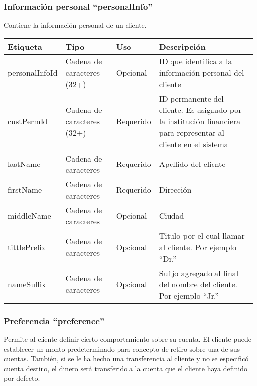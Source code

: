 \subsubsection{Información personal ``personalInfo''}
Contiene la información personal de un cliente.

\begin{center}
\begin{longtable}{|>{\centering\arraybackslash}p{}|>{\centering\arraybackslash}p{}|>{\centering\arraybackslash}p{}|>{\centering\arraybackslash}p{}|}
\hline 
\bfseries {Etiqueta} & \bfseries {Tipo} & \bfseries {Uso} & \bfseries {Descripción} \\ 
\hline 
personalInfoId & Cadena de caracteres (32+) & Opcional & ID que identifica a la información personal del cliente \\ 
\hline 
custPermId & Cadena de caracteres (32+) & Requerido & ID permanente del cliente. Es asignado por la institución financiera para representar al cliente en el sistema \\
\hline 
lastName & Cadena de caracteres & Requerido & Apellido del cliente \\ 
\hline 
firstName & Cadena de caracteres & Requerido & Dirección \\ 
\hline
middleName & Cadena de caracteres & Opcional & Ciudad \\ 
\hline
tittlePrefix & Cadena de caracteres & Opcional & Titulo por el cual llamar al cliente. Por ejemplo ``Dr.'' \\ 
\hline
nameSuffix & Cadena de caracteres & Opcional & Sufijo agregado al final del nombre del cliente. Por ejemplo ``Jr.'' \\ 
\hline
\end{longtable}
\end{center}

\subsubsection{Preferencia ``preference''}
Permite al cliente definir cierto comportamiento sobre su cuenta. El cliente puede establecer un monto predeterminado para concepto de retiro sobre una de sus cuentas. También, si se le ha hecho una transferencia al cliente y no se especificó cuenta destino, el dinero será transferido a la cuenta que el cliente haya definido por defecto.

